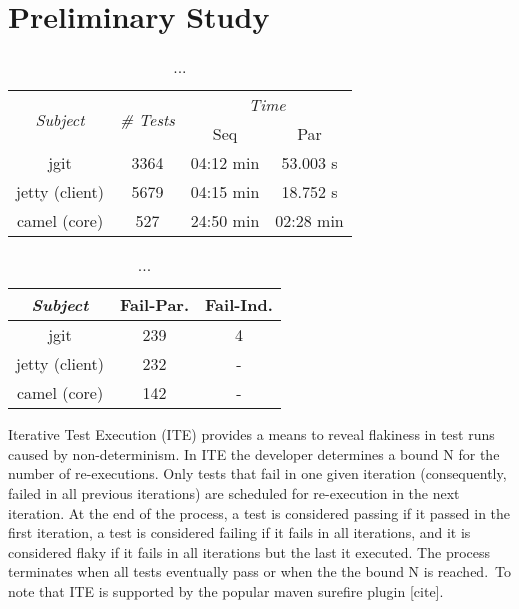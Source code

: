 \section{Preliminary Study}

\begin{table}
  \centering
  \begin{tabular}{|c|c|c|c|}
    \hline
    \multirow{2}{*}{\emph{Subject}} & \multirow{2}{*}{\emph{\# Tests}} &  \multicolumn{2}{c|}{\emph{Time}}\\
    \cline{3-4}
    & & Seq & Par \\
    \hline
    jgit & 3364 & 04:12 min & 53.003 s \\
    \hline
    jetty (client) & 5679 & 04:15 min & 18.752 s \\
    \hline
    camel (core) & 527 & 24:50 min & 02:28 min \\
    \hline
  \end{tabular}
  \caption{\label{table:cost}...}
\end{table}

\begin{table}
  \centering
  \begin{tabular}{|c|c|c|}
    \hline
    \emph{Subject} & Fail-Par. & Fail-Ind. \\
    \hline
    jgit & 239 & 4 \\
    \hline
    jetty (client) & 232 & - \\
    \hline
    camel (core) & 142 & - \\
    \hline
  \end{tabular}
  \caption{\label{table:failures}...}
\end{table}

Iterative Test Execution (ITE) provides a means to reveal flakiness in
test runs caused by non-determinism.  In ITE the developer determines
a bound N for the number of re-executions.  Only tests that fail in
one given iteration (consequently, failed in all previous iterations)
are scheduled for re-execution in the next iteration.  At the end of
the process, a test is considered passing if it passed in the first
iteration, a test is considered failing if it fails in all iterations,
and it is considered flaky if it fails in all iterations but the last
it executed.  The process terminates when all tests eventually pass or
when the the bound N is reached.~To note that ITE is supported by the popular maven
surefire plugin [cite].
